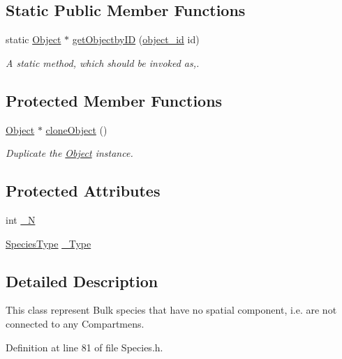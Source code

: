 \subsection*{Static Public Member Functions}
\begin{DoxyCompactItemize}
\item 
static \hyperlink{classObject}{Object} $\ast$ \hyperlink{classObject_a0fcfbdfa4439b322c375a5f99c3dfabd}{get\-Objectby\-I\-D} (\hyperlink{Object_8h_a0b56ddf6ace42572542aae1f2c364e05}{object\-\_\-id} id)
\begin{DoxyCompactList}\small\item\em A static method, which should be invoked as,. \end{DoxyCompactList}\end{DoxyCompactItemize}
\subsection*{Protected Member Functions}
\begin{DoxyCompactItemize}
\item 
\hyperlink{classObject}{Object} $\ast$ \hyperlink{classObject_a11a1dd53ef68fc4a1ad8c6175132c8d5}{clone\-Object} ()
\begin{DoxyCompactList}\small\item\em Duplicate the \hyperlink{classObject}{Object} instance. \end{DoxyCompactList}\end{DoxyCompactItemize}
\subsection*{Protected Attributes}
\begin{DoxyCompactItemize}
\item 
int \hyperlink{classSpecies_aaf64f0a20dc213a6f03c69e7c3caa43a}{\-\_\-\-N}
\item 
\hyperlink{Species_8h_af8f3afcc030f67a124aa4a6b5badf495}{Species\-Type} \hyperlink{classSpecies_ae80ccbaa2b115cea250b7f87ce517105}{\-\_\-\-Type}
\end{DoxyCompactItemize}


\subsection{Detailed Description}
This class represent Bulk species that have no spatial component, i.\-e. are not connected to any Compartmens. 

Definition at line 81 of file Species.\-h.



